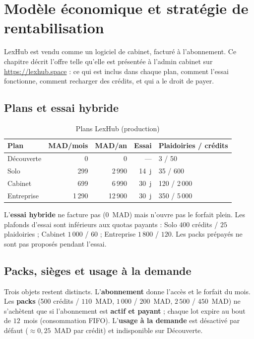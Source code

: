 \chapter{Modèle économique et stratégie de rentabilisation}
\label{ch:economie}

LexHub est vendu comme un logiciel de cabinet, facturé à l'abonnement. Ce chapitre décrit l'offre telle qu'elle est présentée à l'admin cabinet sur \url{https://lexhub.space} : ce qui est inclus dans chaque plan, comment l'essai fonctionne, comment recharger des crédits, et qui a le droit de payer.

\section{Plans et essai hybride}

\begin{table}[H]
\centering
\caption{Plans LexHub (production)}
\label{tab:plans}
\small
\begin{tabular}{@{}lrrrl@{}}
\toprule
\textbf{Plan} & \textbf{MAD/mois} & \textbf{MAD/an} & \textbf{Essai} & \textbf{Plaidoiries / crédits} \\
\midrule
Découverte & 0 & 0 & --- & 3 / 50 \\
Solo & 299 & 2\,990 & 14~j & 35 / 600 \\
Cabinet & 699 & 6\,990 & 30~j & 120 / 2\,000 \\
Entreprise & 1\,290 & 12\,900 & 30~j & 350 / 5\,000 \\
\bottomrule
\end{tabular}
\end{table}

L'\textbf{essai hybride} ne facture pas ($0$~MAD) mais n'ouvre pas le forfait plein. Les plafonds d'essai sont inférieurs aux quotas payants : Solo $400$ crédits / $25$ plaidoiries ; Cabinet $1\,000$ / $60$ ; Entreprise $1\,800$ / $120$. Les packs prépayés ne sont pas proposés pendant l'essai.

\section{Packs, sièges et usage à la demande}

Trois objets restent distincts. L'\textbf{abonnement} donne l'accès et le forfait du mois. Les \textbf{packs} (500 crédits / $110$~MAD, $1\,000$ / $200$~MAD, $2\,500$ / $450$~MAD) ne s'achètent que si l'abonnement est \textbf{actif et payant} ; chaque lot expire au bout de $12$~mois (consommation FIFO). L'\textbf{usage à la demande} est désactivé par défaut ($\approx 0{,}25$~MAD par crédit) et indisponible sur Découverte.


